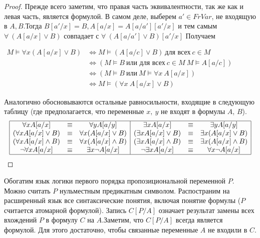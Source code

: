 \begin{proof}
     Прежде всего заметим, что правая часть эквивалентности, так же как и левая часть, является формулой. В самом деле, выберем $a'\in FrVar$, не входящую в $A,B$.Тогда $B[a'/x]=B,A[a/x]=A[a/a'][a'/x]$ и тем самым $\forall \:(A[a/x]\lor B)$ совпадает с  $\forall \:(A[a/a']\lor B)[a'/x]$ Получаем
     \begin{center}
         $\begin{aligned}
    M \vDash \forall x(A[a / x] \vee B) & \Longleftrightarrow M \vDash(A[a / c] \vee B) \ \text{для всех} \ c \in M \\
    & \Longleftrightarrow(M \vDash B \ \text{или для всех} \ c \in M \ M \vDash A[a / c]) \\
    & \Longleftrightarrow(M \vDash B \ \text{или} \ M \vDash \forall x \  A[a / x]) \\
    & \Longleftrightarrow M \vDash (\forall x \  A[a / x] \vee B)
    \end{aligned}$
     \end{center}
     Аналогично обосновываются остальные равносильности, входящие в следующую таблицу (где предполагается, что переменные $x, \ y$ не входят в формулы $A$, $B$).\\
$$
\begin{array}{|ccc|ccc|}
\hline \forall x A[a / x] & {\equiv} & {\forall y A[a / y]} & {\exists x A[a / x]} & {\equiv} & {\exists y A[a / y]} \\
{(\forall x A[a / x] \vee B)} & {\equiv} & {\forall x(A[a / x] \vee B)} & {(\exists x A[a / x] \vee B)} & {\equiv} & {\exists x(A[a / x] \vee B)} \\
{(\forall x A[a / x] \wedge B)} & {\equiv} & {\forall x(A[a / x] \wedge B)} & {(\exists x A[a / x] \wedge B)} & {\equiv} & {\exists x(A[a / x] \wedge B)} \\
{\neg \forall x A[a / x]} & {\equiv} & {\exists x \neg A[a / x]} & {\neg \exists x A[a / x]} & {\equiv} & {\forall x \neg A[a / x]} \\
\hline
\end{array}
$$
\end{proof}
\begin{definition}
    Обогатим язык логики первого порядка пропозициональной переменной $P$. Можно считать $P$ нульместным предикатным символом. Распостраним на расширенный язык все синтаксические понятия, включая понятие формулы ($P$ считается атомарной формулой). Запись $C[P/A]$ означает результат замены всех вхождений $P$ в формулу $C$ на $A$.Заметим, что $C[P/A]$ всегда является формулой. Для этого достаточно, чтобы связанные переменные $A$ не входили в $C$.
\end{definition}
